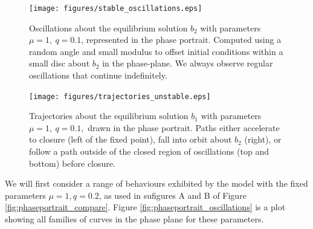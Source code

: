 \documentclass{article}
\begin{document}
\begin{figure}
    \centering
    \texttt{[image: figures/stable\_oscillations.eps]}
    \caption{
        Oscillations about the equilibrium solution $b_2$ with parameters $\mu=1,~q=0.1$, represented in the phase portrait.
        Computed using a random angle and small modulus to offset initial conditions within a small disc about $b_2$ in the phase-plane.
        We always observe regular oscillations that continue indefinitely.
    }
    \label{fig:stable_oscillations}
\end{figure}

\begin{figure}
    \centering
    \texttt{[image: figures/trajectories\_unstable.eps]}
    \caption{
        Trajectories about the equilibrium solution $b_1$ with parameters $\mu=1,~q=0.1,$ drawn in the phase portrait.
        Paths either accelerate to closure (left of the fixed point), fall into orbit about $b_2$ (right),
        or follow a path outside of the closed region of oscillations (top and bottom) before closure.
    }
    \label{fig:unstable_trajectories}
\end{figure}
We will first consider a range of behaviours exhibited by the model with the fixed parameters $\mu=1, q=0.2$,
as used in sufigures A and B of Figure \ref{fig:phaseportrait_compare}.
Figure \ref{fig:phaseportrait_oscillations} is a plot showing all families of curves in the phase plane for these parameters.
\end{document}
